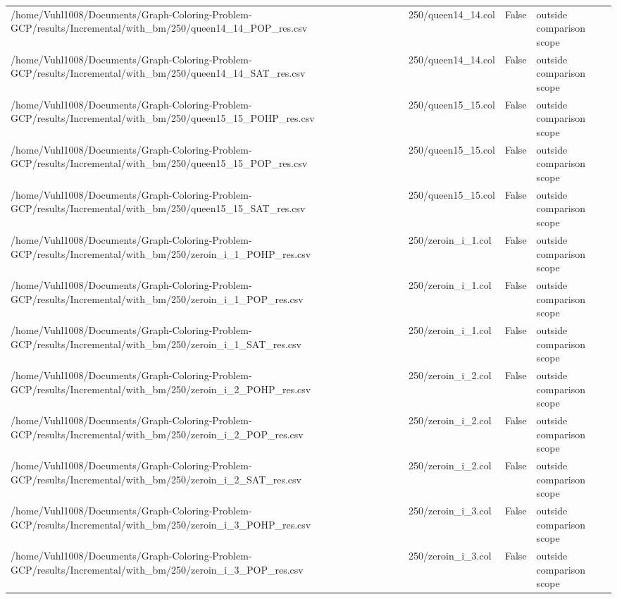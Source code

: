 \begin{table}[htbp]
\begin{tabular}{llll}
/home/Vuhl1008/Documents/Graph-Coloring-Problem-GCP/results/Incremental/with\_bm/250/queen14\_14\_POP\_res.csv & 250/queen14\_14.col & False & outside comparison scope \\
/home/Vuhl1008/Documents/Graph-Coloring-Problem-GCP/results/Incremental/with\_bm/250/queen14\_14\_SAT\_res.csv & 250/queen14\_14.col & False & outside comparison scope \\
/home/Vuhl1008/Documents/Graph-Coloring-Problem-GCP/results/Incremental/with\_bm/250/queen15\_15\_POHP\_res.csv & 250/queen15\_15.col & False & outside comparison scope \\
/home/Vuhl1008/Documents/Graph-Coloring-Problem-GCP/results/Incremental/with\_bm/250/queen15\_15\_POP\_res.csv & 250/queen15\_15.col & False & outside comparison scope \\
/home/Vuhl1008/Documents/Graph-Coloring-Problem-GCP/results/Incremental/with\_bm/250/queen15\_15\_SAT\_res.csv & 250/queen15\_15.col & False & outside comparison scope \\
/home/Vuhl1008/Documents/Graph-Coloring-Problem-GCP/results/Incremental/with\_bm/250/zeroin\_i\_1\_POHP\_res.csv & 250/zeroin\_i\_1.col & False & outside comparison scope \\
/home/Vuhl1008/Documents/Graph-Coloring-Problem-GCP/results/Incremental/with\_bm/250/zeroin\_i\_1\_POP\_res.csv & 250/zeroin\_i\_1.col & False & outside comparison scope \\
/home/Vuhl1008/Documents/Graph-Coloring-Problem-GCP/results/Incremental/with\_bm/250/zeroin\_i\_1\_SAT\_res.csv & 250/zeroin\_i\_1.col & False & outside comparison scope \\
/home/Vuhl1008/Documents/Graph-Coloring-Problem-GCP/results/Incremental/with\_bm/250/zeroin\_i\_2\_POHP\_res.csv & 250/zeroin\_i\_2.col & False & outside comparison scope \\
/home/Vuhl1008/Documents/Graph-Coloring-Problem-GCP/results/Incremental/with\_bm/250/zeroin\_i\_2\_POP\_res.csv & 250/zeroin\_i\_2.col & False & outside comparison scope \\
/home/Vuhl1008/Documents/Graph-Coloring-Problem-GCP/results/Incremental/with\_bm/250/zeroin\_i\_2\_SAT\_res.csv & 250/zeroin\_i\_2.col & False & outside comparison scope \\
/home/Vuhl1008/Documents/Graph-Coloring-Problem-GCP/results/Incremental/with\_bm/250/zeroin\_i\_3\_POHP\_res.csv & 250/zeroin\_i\_3.col & False & outside comparison scope \\
/home/Vuhl1008/Documents/Graph-Coloring-Problem-GCP/results/Incremental/with\_bm/250/zeroin\_i\_3\_POP\_res.csv & 250/zeroin\_i\_3.col & False & outside comparison scope \\

\end{tabular}
\end{table}
